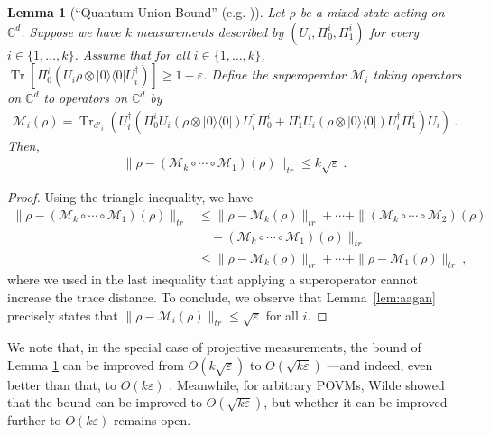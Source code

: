 \documentclass[12pt]{report}
\theoremstyle{plain}
\newtheorem{lemma}[theorem]{Lemma}
\theoremstyle{definition}
\newcommand{\C}{{\mathbb C}}
\newcommand{\eps}{\varepsilon}
\newcommand{\ketbra}[2]{|#1\rangle\!\langle#2|}
\newcommand{\proj}[1]{\ketbra{#1}{#1}}
\newcommand{\Tr}{\operatorname{Tr}}
\begin{document}
\begin{lemma}[``Quantum Union Bound'' (e.g. \cite{aar:qmaqpoly})]
\label{lem:qunionbound}
Let $\rho$ be a mixed state acting on $\C^d$. Suppose we have $k$ measurements described by $(U_i, \Pi_0^i, \Pi_1^i)$ for every $i \in \{1, \dots, k\}$. Assume that for all $i \in \{1, \dots, k\}$, $\Tr[\Pi_0^i (U_i \rho \otimes \proj{0} U_i^{\dagger})] \geq 1-\eps$. Define the superoperator $\mathcal{M}_i$ taking operators on $\C^d$ to operators on $\C^d$ by
\begin{align*}
\mathcal{M}_i(\rho) = \Tr_{d'_i}\left(U_i^{\dagger} \left( \Pi^i_0 U_i (\rho \otimes \proj{0}) U_i^{\dagger} \Pi^i_0  +  \Pi_1^i U_i (\rho \otimes \proj{0}) U_i^{\dagger} \Pi_1^i \right) U_i \right) \ .
\end{align*}
Then,
\begin{align*}
\| \rho - (\mathcal{M}_k \circ \cdots \circ \mathcal{M}_1)(\rho) \|_{tr} \leq k \sqrt{\eps} \ .
\end{align*}
\end{lemma}
\begin{proof}
Using the triangle inequality, we have
\begin{align*}
\| \rho - (\mathcal{M}_k \circ \cdots \circ \mathcal{M}_1)(\rho) \|_{tr}
&\leq \| \rho - \mathcal{M}_k(\rho) \|_{tr} + \cdots + \| (\mathcal{M}_{k} \circ \cdots \circ \mathcal{M}_2)(\rho) \\
& \quad - (\mathcal{M}_k \circ \cdots \circ \mathcal{M}_1)(\rho) \|_{tr} \\
&\leq \| \rho - \mathcal{M}_k(\rho) \|_{tr} + \cdots + \| \rho - \mathcal{M}_1(\rho) \|_{tr} \ ,
\end{align*}
where we used in the last inequality that applying a superoperator cannot increase the trace distance. To conclude, we observe that Lemma~\ref{lem:aagan} precisely states that $\| \rho - \mathcal{M}_i(\rho) \|_{tr} \leq \sqrt{\eps}$ for all $i$.
\end{proof}
We note that, in the special case of projective measurements, the bound of Lemma \ref{lem:qunionbound} can be improved from $O(k \sqrt{\eps})$ to $O(\sqrt{k \eps})$ \cite{sen}---and indeed, even better than that, to $O(k \eps)$ \cite{gao}.  Meanwhile, for arbitrary POVMs, Wilde \cite{wilde} showed that the bound can be improved to $O(\sqrt{k \eps})$, but whether it can be improved further to $O(k\eps)$ remains open.
\end{document}
